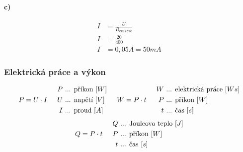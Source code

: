 \documentclass[12pt]{article}
\begin{document}
\paragraph{c)}
\begin{equation}
\begin{split}
\nonumber
I&=\frac{U}{R_{\texttt{celkové}}}\\
I&=\frac{20}{400}\\
I&=0,05A = 50mA
\end{split}
\end{equation}

\subsubsection{Elektrická práce a výkon}
\begin{equation}
\begin{split}
\nonumber
P = U\cdot I
\end{split}
\hspace{0,5cm}
\begin{split}
\nonumber
P&\text{ ... příkon }[W]\\
U&\text{ ... napětí }[V]\\
I&\text{ ... proud }[A]\\
\end{split}
\hspace{0,5cm}
\begin{split}
\nonumber
W = P\cdot t
\end{split}
\hspace{0,5cm}
\begin{split}
\nonumber
W&\text{ ... elektrická práce }[Ws]\\
P&\text{ ... příkon }[W]\\
t&\text{ ... čas }[s]\\
\end{split}
\end{equation}
\begin{equation}
\begin{split}
\nonumber
Q = P\cdot t
\end{split}
\hspace{0,5cm}
\begin{split}
\nonumber
Q&\text{ ... Jouleovo teplo }[J]\\
P&\text{ ... příkon }[W]\\
t&\text{ ... čas }[s]\\
\end{split}
\end{equation}
\end{document}

